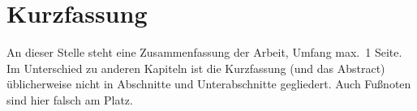 \chapter{Kurzfassung}

An dieser Stelle steht eine Zusammenfassung der Arbeit, Umfang
max.\ 1 Seite. Im Unterschied zu anderen Kapiteln ist die
Kurzfassung (und das Abstract) üblicherweise nicht in Abschnitte
und Unterabschnitte gegliedert.
Auch Fußnoten sind hier falsch am Platz.

